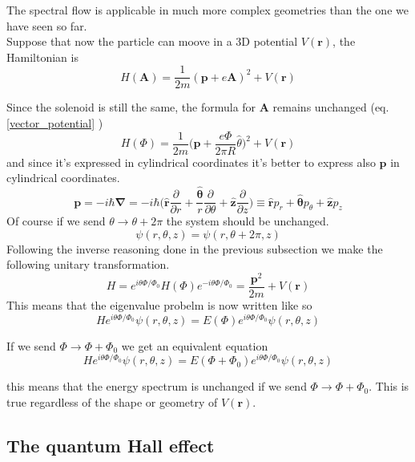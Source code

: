         The spectral flow is applicable in much more complex geometries than the one we have seen so far.\\
        Suppose that now the particle can moove in a 3D potential $V(\mathbf r)$, the Hamiltonian is
        \[
            H(\mathbf A)=\frac 1{2m}(\mathbf p + e\mathbf A)^2 + V(\mathbf r) 
        \]

        Since the solenoid is still the same, the formula for $\mathbf A$ remains unchanged (eq. \ref{vector_potential} )
        \[
            H(\Phi)=\frac 1{2m}\bigg(\mathbf p + \frac{e\Phi}{2\pi R}\hat \theta\bigg)^2 + V(\mathbf r)
        \]
        and since it's expressed in cylindrical coordinates it's better to express also $\mathbf p$ in cylindrical coordinates.
        \[
         \mathbf p =-i\hbar \mathbf \nabla=-i\hbar\bigg( 
             \mathbf{\hat r}\frac{\partial}{\partial r}+ \frac{\mathbf {\hat \theta}}{r}\frac{\partial}{\partial \theta} + \mathbf{\hat z}\frac{\partial}{\partial z}  \bigg) \equiv
             \mathbf{\hat r} p_r+ \mathbf {\hat \theta} p_\theta + \mathbf{\hat z} p_z
        \]
        Of course if we send $\theta \to \theta + 2\pi$ the system should be unchanged.
        \[
            \psi(r,\theta,z)=\psi(r,\theta+2\pi,z)
        \]
        Following the inverse reasoning done in the previous subsection we make the following unitary transformation.
        \[
            H=e^{i\theta\Phi/\Phi_0}H(\Phi)e^{-i\theta\Phi/\Phi_0}=\frac  {\mathbf p^2} {2m} + V(\mathbf r)
        \]
        This means that the eigenvalue probelm is now written like so
        \[
            He^{i\theta\Phi/\Phi_0}\psi(r,\theta,z)=E(\Phi)e^{i\theta\Phi/\Phi_0}\psi(r,\theta,z)
        \]

        If we send $\Phi \to \Phi+\Phi_0$ we get an equivalent equation
        \[
            He^{i\theta\Phi/\Phi_0}\psi(r,\theta,z)=E(\Phi+\Phi_0)e^{i\theta\Phi/\Phi_0}\psi(r,\theta,z)
        \]

        this means that the energy spectrum is unchanged if we send $\Phi \to \Phi+\Phi_0$. This is true regardless of the shape or geometry of $V(\mathbf r)$.
        
    
    \subsection*{The quantum Hall effect}

    
    
